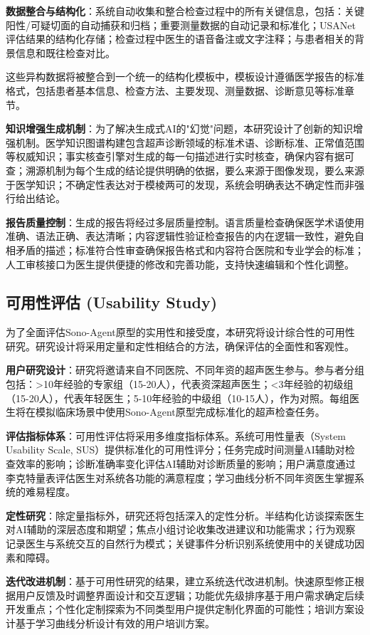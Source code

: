 \textbf{数据整合与结构化}：系统自动收集和整合检查过程中的所有关键信息，包括：关键阳性/可疑切面的自动捕获和归档；重要测量数据的自动记录和标准化；USANet评估结果的结构化存储；检查过程中医生的语音备注或文字注释；与患者相关的背景信息和既往检查对比。

这些异构数据将被整合到一个统一的结构化模板中，模板设计遵循医学报告的标准格式，包括患者基本信息、检查方法、主要发现、测量数据、诊断意见等标准章节。

\textbf{知识增强生成机制}：为了解决生成式AI的"幻觉"问题，本研究设计了创新的知识增强机制。医学知识图谱构建包含超声诊断领域的标准术语、诊断标准、正常值范围等权威知识；事实核查引擎对生成的每一句描述进行实时核查，确保内容有据可查；溯源机制为每个生成的结论提供明确的依据，要么来源于图像发现，要么来源于医学知识；不确定性表达对于模棱两可的发现，系统会明确表达不确定性而非强行给出结论。

\textbf{报告质量控制}：生成的报告将经过多层质量控制。语言质量检查确保医学术语使用准确、语法正确、表达清晰；内容逻辑性验证检查报告的内在逻辑一致性，避免自相矛盾的描述；标准符合性审查确保报告格式和内容符合医院和专业学会的标准；人工审核接口为医生提供便捷的修改和完善功能，支持快速编辑和个性化调整。

\subsection{可用性评估 (Usability Study)}

为了全面评估Sono-Agent原型的实用性和接受度，本研究将设计综合性的可用性研究。研究设计将采用定量和定性相结合的方法，确保评估的全面性和客观性。

\textbf{用户研究设计}：研究将邀请来自不同医院、不同年资的超声医生参与。参与者分组包括：>10年经验的专家组（15-20人），代表资深超声医生；<3年经验的初级组（15-20人），代表年轻医生；5-10年经验的中级组（10-15人），作为对照。每组医生将在模拟临床场景中使用Sono-Agent原型完成标准化的超声检查任务。

\textbf{评估指标体系}：可用性评估将采用多维度指标体系。系统可用性量表（System Usability Scale, SUS）提供标准化的可用性评分；任务完成时间测量AI辅助对检查效率的影响；诊断准确率变化评估AI辅助对诊断质量的影响；用户满意度通过李克特量表评估医生对系统各功能的满意程度；学习曲线分析不同年资医生掌握系统的难易程度。

\textbf{定性研究}：除定量指标外，研究还将包括深入的定性分析。半结构化访谈探索医生对AI辅助的深层态度和期望；焦点小组讨论收集改进建议和功能需求；行为观察记录医生与系统交互的自然行为模式；关键事件分析识别系统使用中的关键成功因素和障碍。

\textbf{迭代改进机制}：基于可用性研究的结果，建立系统迭代改进机制。快速原型修正根据用户反馈及时调整界面设计和交互逻辑；功能优先级排序基于用户需求确定后续开发重点；个性化定制探索为不同类型用户提供定制化界面的可能性；培训方案设计基于学习曲线分析设计有效的用户培训方案。


